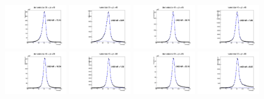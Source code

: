 \documentclass[thesis.tex]{subfiles}
\renewcommand\_{\textunderscore\allowbreak}
\begin{document}
\begin{figure}[hbtp]
  \centering
   \includegraphics[width=0.24\textwidth]{Figures/Bw_ker_pt_den_35_40.pdf}  \includegraphics[width=0.24\textwidth]{Figures/Bw_ker_pt_num_35_40.pdf}   \includegraphics[width=0.24\textwidth]{Figures/Bw_ker_pt_den_40_45.pdf} \includegraphics[width=0.24\textwidth]{Figures/Bw_ker_pt_num_40_45.pdf} \\ 
   \includegraphics[width=0.24\textwidth]{Figures/Bw_ker_pt_den_45_50.pdf}  \includegraphics[width=0.24\textwidth]{Figures/Bw_ker_pt_num_45_50.pdf}   \includegraphics[width=0.24\textwidth]{Figures/Bw_ker_pt_den_50_55.pdf} \includegraphics[width=0.24\textwidth]{Figures/Bw_ker_pt_num_50_55.pdf} \\

\end{figure}
\end{document}
